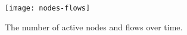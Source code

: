 
\begin{figure}[!t]
\vspace{0.5em}
\begin{center}
\texttt{[image: nodes-flows]}%
\vspace{-1.25em}%
\caption{The number of active nodes and flows over time.} 
\label{fig:nodes-flows}
\end{center}
\vspace{-1.5em}
\end{figure}
